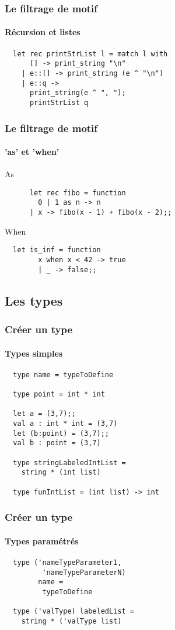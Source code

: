 \begin{frame}[fragile]
	\frametitle{Le filtrage de motif}
	\framesubtitle{Récursion et listes}
		\begin{lstlisting}
  let rec printStrList l = match l with
      [] -> print_string "\n"
    | e::[] -> print_string (e ^ "\n")
    | e::q -> 
      print_string(e ^ ", ");
      printStrList q
		\end{lstlisting}
\end{frame}

\begin{frame}[fragile]
  	\frametitle{Le filtrage de motif}
	\framesubtitle{'as' et 'when'}
  	\begin{block}{As}
    	\begin{lstlisting}
	  let rec fibo = function 
 	    0 | 1 as n -> n 
 	  | x -> fibo(x - 1) + fibo(x - 2);; 
    	\end{lstlisting}
  	\end{block}
  	\begin{block}{When}
    	\begin{lstlisting}
  let is_inf = function 
        x when x < 42 -> true
    	| _ -> false;;
    	\end{lstlisting}
  	\end{block}
\end{frame}

\subsection{Les types} %
\begin{frame}[fragile]
	\frametitle{Créer un type}
	\framesubtitle{Types simples}
	\begin{lstlisting}
  type name = typeToDefine

  type point = int * int

  let a = (3,7);;
  val a : int * int = (3,7)
  let (b:point) = (3,7);;
  val b : point = (3,7)
  
  type stringLabeledIntList = 
    string * (int list)

  type funIntList = (int list) -> int
	\end{lstlisting}
\end{frame}

\begin{frame}[fragile]
	\frametitle{Créer un type}
	\framesubtitle{Types paramétrés}
	\begin{lstlisting}
  type ('nameTypeParameter1,
 	     'nameTypeParameterN) 
   	    name = 
         typeToDefine
    
  type ('valType) labeledList =
    string * ('valType list) 
	\end{lstlisting}
\end{frame}


